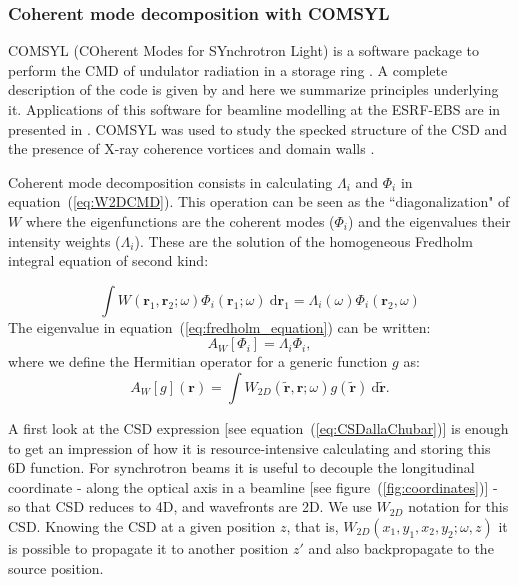 \documentclass{iucr}              %
\begin{document}
\subsubsection{Coherent mode decomposition with COMSYL\\}\label{sec:COMSYL} 
 COMSYL (COherent Modes for SYnchrotron Light) is a software package to perform the CMD of undulator radiation in a storage ring \cite{codeCOMSYL}. A complete description of the code is given by  and here we summarize principles underlying it. Applications of this software for beamline modelling at the ESRF-EBS are in presented in \cite{glass2017, hierarchical}. COMSYL was used to study the specked structure of the CSD and the presence of X-ray coherence vortices and domain walls \cite{PaganinSanchezDelRio2019}.

Coherent mode decomposition consists in calculating $\Lambda_i$ and $\Phi_i$ in equation~(\ref{eq:W2DCMD}). This operation can be seen as the ``diagonalization" of $W$ where the eigenfunctions are the coherent modes ($\Phi_i$) and the eigenvalues their intensity weights ($\Lambda_i$). These are the solution of the homogeneous Fredholm integral equation of second kind:

\begin{equation}\label{eq:fredholm_equation}
\int W(\textbf{r}_1,\textbf{r}_2;\omega)
\Phi_i(\textbf{r}_1;\omega)~\text{d}\textbf{r}_1  = \Lambda_i(\omega) \Phi_i(\textbf{r}_2,\omega)
\end{equation}
The eigenvalue in equation~(\ref{eq:fredholm_equation}) can be written: 
\begin{equation}
A_{W}[\Phi_i] = \Lambda_i \Phi_i,
\end{equation}
where we define the Hermitian operator for a generic function $g$ as:
\begin{equation}\label{eq:Hermitian}
A_{W}[g](\textbf{r})  = \int W_{2D}(\tilde{\textbf{r}},\textbf{r};\omega) g(\tilde{\textbf{r}})~ \text{d}\tilde{\textbf{r}}.
\end{equation}

A first look at the CSD expression [see equation~(\ref{eq:CSDallaChubar})] is enough to get an impression of how it is resource-intensive calculating and storing this 6D function. For synchrotron beams it is useful to decouple the longitudinal coordinate - along the optical axis in a beamline [see figure~(\ref{fig:coordinates})] - so that CSD reduces to 4D, and wavefronts are 2D. We use $W_{2D}$ notation for this CSD. Knowing the CSD at a given position $z$, that is, $W_{2D}(x_1,y_1,x_2,y_2; \omega, z)$ it is possible to propagate it to another position $z'$ and also backpropagate to the source position.
\end{document}
